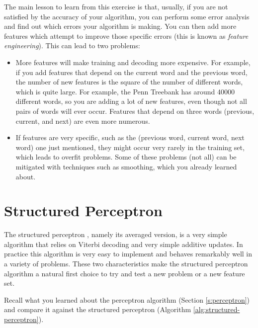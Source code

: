 The main lesson to learn from this exercise is that, usually, if you are not satisfied by the accuracy of your algorithm, you can perform some error analysis and find out which errors your algorithm is making. You can then add more features which attempt to improve those specific errors (this is known as \emph{feature engineering}). This can lead to two problems:
\begin{itemize}
\item More features will make training and decoding more expensive. For example, if you add features that depend on the current word and the previous word, the number of new features is the square of the number of different words, which is quite large. For example, the Penn Treebank has around 40000 different words, so you are adding a lot of new features, even though not all pairs of words will ever occur. Features that depend on three words (previous, current, and next) are even more numerous.
\item If features are very specific, such as the (previous word, current word, next word) one just mentioned, they might occur very rarely in the training set, which leads to overfit problems. Some of these problems (not all) can be mitigated with techniques such as smoothing, which you already learned about.
\end{itemize}




\section{\label{s:spercetron}Structured Perceptron}

The structured perceptron \citep{collins2002discriminative}, namely its averaged version, is a very simple
algorithm that relies on Viterbi decoding and very simple additive
updates. In practice this algorithm is very easy to implement and
behaves remarkably well in a variety of problems. These two
characteristics make the structured perceptron algorithm a natural
first choice to try and test a new problem or a new feature set. 

Recall what you learned about the
perceptron algorithm (Section \ref{s:perceptron}) and compare it against the structured perceptron
(Algorithm \ref{alg:structured-perceptron}). 

